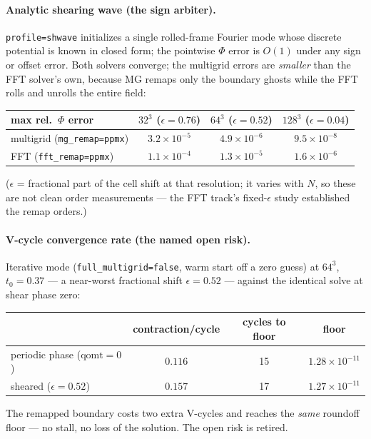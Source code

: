 \documentclass[11pt]{article}
\newcommand{\code}[1]{\texttt{#1}}
\begin{document}
\paragraph{Analytic shearing wave (the sign arbiter).}
\code{profile=shwave} initializes a single rolled-frame Fourier mode whose discrete
potential is known in closed form; the pointwise $\Phi$ error is $O(1)$ under any
sign or offset error. Both solvers converge; the multigrid errors are
\emph{smaller} than the FFT solver's own, because MG remaps only the boundary
ghosts while the FFT rolls and unrolls the entire field:
\begin{center}
\small
\begin{tabular}{@{}lccc@{}}
\toprule
max rel.\ $\Phi$ error & $32^3$ ($\epsilon{=}0.76$) & $64^3$ ($\epsilon{=}0.52$)
  & $128^3$ ($\epsilon{=}0.04$) \\
\midrule
multigrid (\code{mg\_remap=ppmx}) & $3.2\times10^{-5}$ & $4.9\times10^{-6}$ & $9.5\times10^{-8}$ \\
FFT (\code{fft\_remap=ppmx})      & $1.1\times10^{-4}$ & $1.3\times10^{-5}$ & $1.6\times10^{-6}$ \\
\bottomrule
\end{tabular}
\end{center}
($\epsilon$ = fractional part of the cell shift at that resolution; it varies with
$N$, so these are not clean order measurements --- the FFT track's fixed-$\epsilon$
study established the remap orders.)

\paragraph{V-cycle convergence rate (the named open risk).}
Iterative mode (\code{full\_multigrid=false}, warm start off a zero guess) at
$64^3$, $t_0=0.37$ --- a near-worst fractional shift $\epsilon = 0.52$ --- against
the identical solve at shear phase zero:
\begin{center}
\small
\begin{tabular}{@{}lccc@{}}
\toprule
 & contraction/cycle & cycles to floor & floor \\
\midrule
periodic phase ($\mathrm{qomt}=0$) & $0.116$ & 15 & $1.28\times10^{-11}$ \\
sheared ($\epsilon=0.52$)          & $0.157$ & 17 & $1.27\times10^{-11}$ \\
\bottomrule
\end{tabular}
\end{center}
The remapped boundary costs two extra V-cycles and reaches the \emph{same} roundoff
floor --- no stall, no loss of the solution. The open risk is retired.
\end{document}
